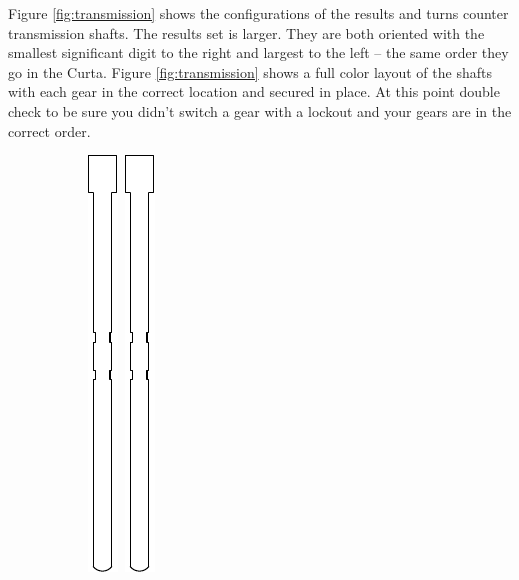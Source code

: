 \documentclass[openany]{book}
\begin{document}
Figure \ref{fig:transmission} shows the configurations of the results and turns counter transmission shafts. The results set is larger. They are both oriented with the smallest significant digit to the right and largest to the left -- the same order they go in the Curta. Figure \ref{fig:transmission}
shows a full color layout of the shafts with each gear in the correct location and secured in place.
At this point double check to be sure you didn't switch a gear with a lockout and your gears 
are in the correct order.



\begin{figure}[!ht]
	\centering
	\begin{subfigure}{.4\textwidth}
		\centering
		\includegraphics[width=.05\textwidth]{images/transmission-result-9.pdf}\, 
		\includegraphics[width=.05\textwidth]{images/transmission-result-9.pdf}\,

\end{subfigure}
\end{figure}
\end{document}
